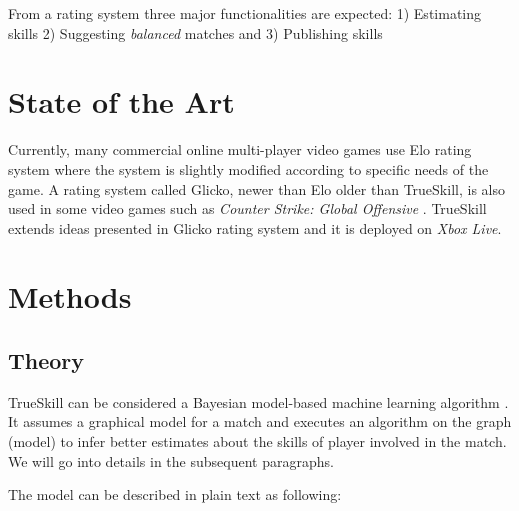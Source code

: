 \documentclass[12pt]{article}
\begin{document}
From a rating system three major functionalities are expected: 1) Estimating skills 2) Suggesting \textit{balanced} matches and 3) Publishing skills
\section{State of the Art}

Currently, many commercial online multi-player video games use Elo rating system where the system is slightly modified  according to specific needs of the game. A rating system called Glicko, newer than Elo older than TrueSkill, is also used in some video games such as \textit{Counter Strike: Global Offensive} \cite{wiki:glicko}. TrueSkill extends ideas presented in Glicko rating system and it is  deployed on \textit{Xbox Live}.

\newpage
\section{Methods}
\subsection{Theory}
TrueSkill can be considered a Bayesian model-based machine learning algorithm \cite{bishop2013model, herbrich2006trueskill}. It assumes a graphical model for a match \cite{alpaydin2014ml} and executes an algorithm on the graph (model) to infer better estimates about the skills of player involved in the match. We will go into details in the subsequent paragraphs.

The model can be described in plain text as following:
\end{document}
